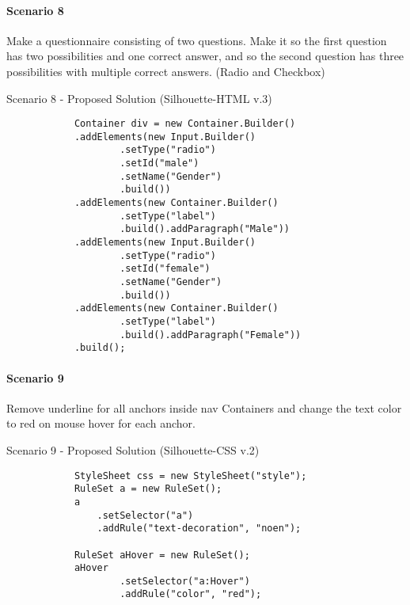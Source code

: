 \documentclass[12pt]{article}
\begin{document}
        \paragraph{Scenario 8}
        Make a questionnaire consisting of two questions. Make it so the first question has two possibilities and one correct answer, and so the second question has three possibilities with multiple correct answers. (Radio and Checkbox)

        \begin{shaded}
            Scenario 8 - Proposed Solution (Silhouette-HTML v.3)
            \begin{lstlisting}
            Container div = new Container.Builder()
            .addElements(new Input.Builder()
                    .setType("radio")
                    .setId("male")
                    .setName("Gender")
                    .build())
            .addElements(new Container.Builder()
                    .setType("label")
                    .build().addParagraph("Male"))
            .addElements(new Input.Builder()
                    .setType("radio")
                    .setId("female")
                    .setName("Gender")
                    .build())
            .addElements(new Container.Builder()
                    .setType("label")
                    .build().addParagraph("Female"))
            .build();
            \end{lstlisting}
        \end{shaded}

        \paragraph{Scenario 9}
        Remove underline for all anchors inside nav Containers and change the text color to red on mouse hover for each anchor.

        \begin{shaded}
            Scenario 9 - Proposed Solution (Silhouette-CSS v.2)
            \begin{lstlisting}
            StyleSheet css = new StyleSheet("style");
            RuleSet a = new RuleSet();
            a
                .setSelector("a")
                .addRule("text-decoration", "noen");
    
            RuleSet aHover = new RuleSet();
            aHover
                    .setSelector("a:Hover")
                    .addRule("color", "red");
            \end{lstlisting}
        \end{shaded}
            
\end{document}
